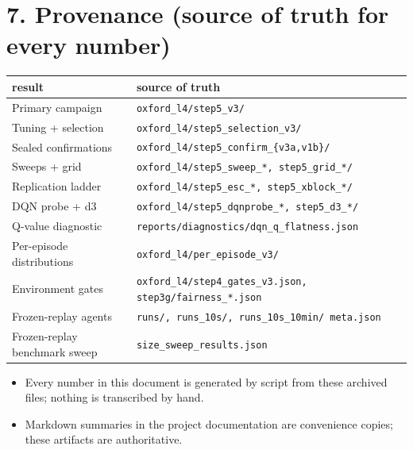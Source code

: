 \documentclass[11pt]{article}
\begin{document}
\section*{7. Provenance (source of truth for every number)}
\begin{center}\small
\begin{tabular}{ll}
\toprule
result & source of truth \\
\midrule
Primary campaign & \texttt{oxford\_l4/step5\_v3/} \\
Tuning + selection & \texttt{oxford\_l4/step5\_selection\_v3/} \\
Sealed confirmations & \texttt{oxford\_l4/step5\_confirm\_\{v3a,v1b\}/} \\
Sweeps + grid & \texttt{oxford\_l4/step5\_sweep\_*, step5\_grid\_*/} \\
Replication ladder & \texttt{oxford\_l4/step5\_esc\_*, step5\_xblock\_*/} \\
DQN probe + d3 & \texttt{oxford\_l4/step5\_dqnprobe\_*, step5\_d3\_*/} \\
Q-value diagnostic & \texttt{reports/diagnostics/dqn\_q\_flatness.json} \\
Per-episode distributions & \texttt{oxford\_l4/per\_episode\_v3/} \\
Environment gates & \texttt{oxford\_l4/step4\_gates\_v3.json, step3g/fairness\_*.json} \\
Frozen-replay agents & \texttt{runs/, runs\_10s/, runs\_10s\_10min/ meta.json} \\
Frozen-replay benchmark sweep & \texttt{size\_sweep\_results.json} \\
\bottomrule
\end{tabular}
\end{center}
\begin{itemize}
\item Every number in this document is generated by script from these archived files;
nothing is transcribed by hand.
\item Markdown summaries in the project documentation are convenience copies; these
artifacts are authoritative.
\end{itemize}
\end{document}
